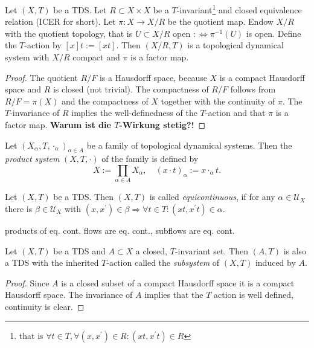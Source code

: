 \begin{proposition}
  Let $(X,T)$ be a TDS. Let $R \subset X \times X$ be a $T$-invariant\footnote{that is $\forall t \in T, \forall (x,x^\prime ) \in R : (xt ,x^\prime t) \in R$} and closed equivalence relation (ICER for short).
  Let $\pi : X \to X/R$ be the quotient map.
  Endow $X/R$ with the quotient topology, that is $U \subset X/R$ open $: \Leftrightarrow \pi^{-1}(U)$ is open.
  Define the $T$-action by $[x] t := [x t]$.
  Then $(X/R, T)$ is a topological dynamical system with $X/R$ compact and $\pi$ is a factor map.
\end{proposition}
\begin{proof}
  The quotient $R/F$ is a Hausdorff space, because $X$ is a compact Hausdorff space and $R$ is closed (not trivial).
 The compactness of $R/F$ follows from $R/F = \pi (X)$ and the compactness of $X$ together with the continuity of $\pi$. The $T$-invariance of $R$ implies the well-definedness of the $T$-action and that $\pi$ is a factor map.
  \textbf{Warum ist die $T$-Wirkung stetig?!}
\end{proof}

\begin{definition}
  Let $(X_\alpha,T, \cdot_\alpha)_{\alpha \in A}$ be a family of topological dynamical systems.
  Then the \emph{product system} $(X, T, \cdot)$ of the family is defined by
  \begin{equation*}
    X := \prod_{\alpha \in A} X_\alpha, \quad (x\cdot t)_{\alpha} := x \cdot_\alpha t.
  \end{equation*}
\end{definition}

\begin{definition}
  Let $(X,T)$ be a TDS.
  Then $(X,T)$ is called \emph{equicontinuous}, if for any $\alpha \in \mathcal{U}_X$ there is $\beta \in \mathcal{U}_X$ with $(x, x^\prime ) \in \beta \Rightarrow \forall t \in T: (xt,x^\prime t) \in \alpha$.
\end{definition}

\begin{proposition}
  products of eq. cont. flows are eq. cont., subflows are eq. cont.
\end{proposition}

\begin{proposition}[Subsystem]
  Let $(X,T)$ be a TDS and $A \subset X$ a closed, $T$-invariant set.
  Then $(A,T)$ is also a TDS with the inherited $T$-action called the \emph{subsystem} of $(X,T)$ induced by $A$.
\end{proposition}
\begin{proof}
  Since $A$ is a closed subset of a compact Hausdorff space it is a compact Hausdorff space. The invariance of $A$ implies that the $T$ action is well defined, continuity is clear. 
\end{proof}

